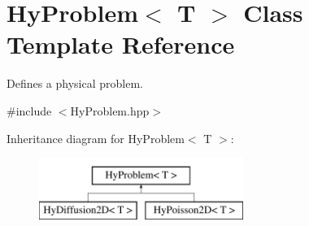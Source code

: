 \hypertarget{classHyProblem}{
\section{HyProblem$<$ T $>$ Class Template Reference}
\label{classHyProblem}
}


Defines a physical problem.  




{\ttfamily \#include $<$HyProblem.hpp$>$}

Inheritance diagram for HyProblem$<$ T $>$:\begin{figure}[H]
\begin{center}
\leavevmode
\includegraphics[height=2cm]{classHyProblem}
\end{center}
\end{figure}
